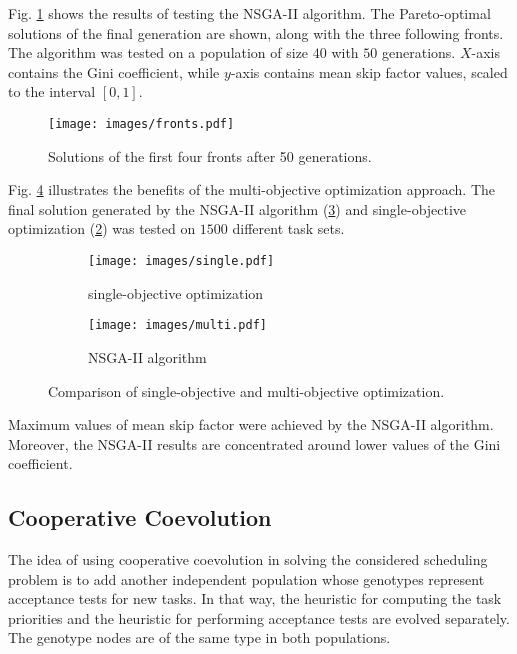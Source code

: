 Fig. \ref{fronts} shows the results of testing the NSGA-II algorithm.
The Pareto-optimal solutions of the final generation are shown, along with the three following fronts.
The algorithm was tested on a population of size $40$ with $50$ generations.
$X$-axis contains the Gini coefficient, while $y$-axis contains mean skip factor values, scaled to the interval $[0, 1]$.
\begin{figure}[ht]
    \centering
    \texttt{[image: images/fronts.pdf]}
    \caption{Solutions of the first four fronts after 50 generations.}
    \label{fronts}
\end{figure}

Fig. \ref{single_vs_multi} illustrates the benefits of the multi-objective optimization approach.
The final solution generated by the NSGA-II algorithm (\ref{multi}) and single-objective optimization (\ref{single}) was tested on $1500$ different task sets.
\begin{figure}[H]
\centering
\begin{subfigure}{.49\textwidth}
\begin{flushleft}
  \centering
  \texttt{[image: images/single.pdf]}
  \caption{single-objective optimization}
  \label{single}
\end{flushleft}
\end{subfigure}
\begin{subfigure}{.49\textwidth}
\begin{flushright}
  \centering
  \texttt{[image: images/multi.pdf]}
  \caption{NSGA-II algorithm}
  \label{multi}
\end{flushright}
\end{subfigure}
\caption{Comparison of single-objective and multi-objective optimization.}
\label{single_vs_multi}
\end{figure}
Maximum values of mean skip factor were achieved by the NSGA-II algorithm.
Moreover, the NSGA-II results are concentrated around lower values of the Gini coefficient.

\subsection{Cooperative Coevolution}
The idea of using cooperative coevolution in solving the considered scheduling problem is to add another independent population whose genotypes represent acceptance tests for new tasks.
In that way, the heuristic for computing the task priorities and the heuristic for performing acceptance tests are evolved separately.
The genotype nodes are of the same type in both populations.

